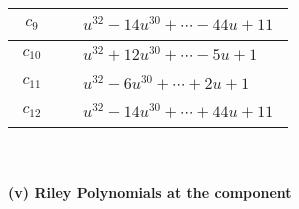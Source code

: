 \documentclass[1p]{elsarticle_modified}
\theoremstyle{definition}
\begin{document}
\begin{tabular}{m{50pt}|m{274pt}}
\hline $$\begin{aligned}c_{9}\end{aligned}$$&$\begin{aligned}
&u^{32}-14 u^{30}+\cdots-44 u+11
\end{aligned}$\\
\hline $$\begin{aligned}c_{10}\end{aligned}$$&$\begin{aligned}
&u^{32}+12 u^{30}+\cdots-5 u+1
\end{aligned}$\\
\hline $$\begin{aligned}c_{11}\end{aligned}$$&$\begin{aligned}
&u^{32}-6 u^{30}+\cdots+2 u+1
\end{aligned}$\\
\hline $$\begin{aligned}c_{12}\end{aligned}$$&$\begin{aligned}
&u^{32}-14 u^{30}+\cdots+44 u+11
\end{aligned}$\\
\hline
\end{tabular}\\~\\
\newpage\renewcommand{\arraystretch}{1}
\flushleft \textbf{(v) Riley Polynomials at the component}\newline \\
\end{document}
